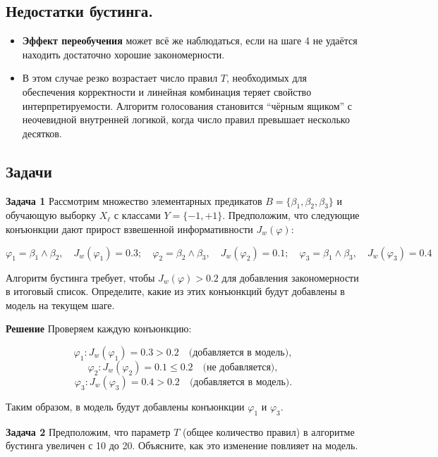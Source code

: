 \subsection*{Недостатки бустинга.}

\begin{itemize}
    \item \textbf{Эффект переобучения} может всё же наблюдаться, если на шаге 4 не удаётся находить достаточно хорошие закономерности.
          
    \item В этом случае резко возрастает число правил $T$, необходимых для обеспечения корректности и линейная комбинация теряет свойство интерпретируемости. Алгоритм голосования становится ``чёрным ящиком'' с неочевидной внутренней логикой, когда число правил превышает несколько десятков.
\end{itemize}

\subsection{Задачи}

\textbf{Задача 1}
Рассмотрим множество элементарных предикатов \( B = \{ \beta_1, \beta_2, \beta_3 \} \) и обучающую выборку \( X_\ell \) с классами \( Y = \{-1, +1\} \). Предположим, что следующие конъюнкции дают прирост взвешенной информативности \( J_w(\varphi) \):

\[
    \varphi_1 = \beta_1 \wedge \beta_2, \quad J_w(\varphi_1) = 0.3; \quad
    \varphi_2 = \beta_2 \wedge \beta_3, \quad J_w(\varphi_2) = 0.1; \quad
    \varphi_3 = \beta_1 \wedge \beta_3, \quad J_w(\varphi_3) = 0.4
\]

Алгоритм бустинга требует, чтобы \( J_w(\varphi) > 0.2 \) для добавления закономерности в итоговый список. Определите, какие из этих конъюнкций будут добавлены в модель на текущем шаге.  

\textbf{Решение}
Проверяем каждую конъюнкцию:  

\[
    \varphi_1: J_w(\varphi_1) = 0.3 > 0.2 \quad \text{(добавляется в модель)},
\]
\[
    \varphi_2: J_w(\varphi_2) = 0.1 \leq 0.2 \quad \text{(не добавляется)},
\]
\[
    \varphi_3: J_w(\varphi_3) = 0.4 > 0.2 \quad \text{(добавляется в модель)}.
\]

Таким образом, в модель будут добавлены конъюнкции \( \varphi_1 \) и \( \varphi_3 \).

\vspace{0.5cm}

\textbf{Задача 2}
Предположим, что параметр \( T \) (общее количество правил) в алгоритме бустинга увеличен с 10 до 20. Объясните, как это изменение повлияет на модель.  

